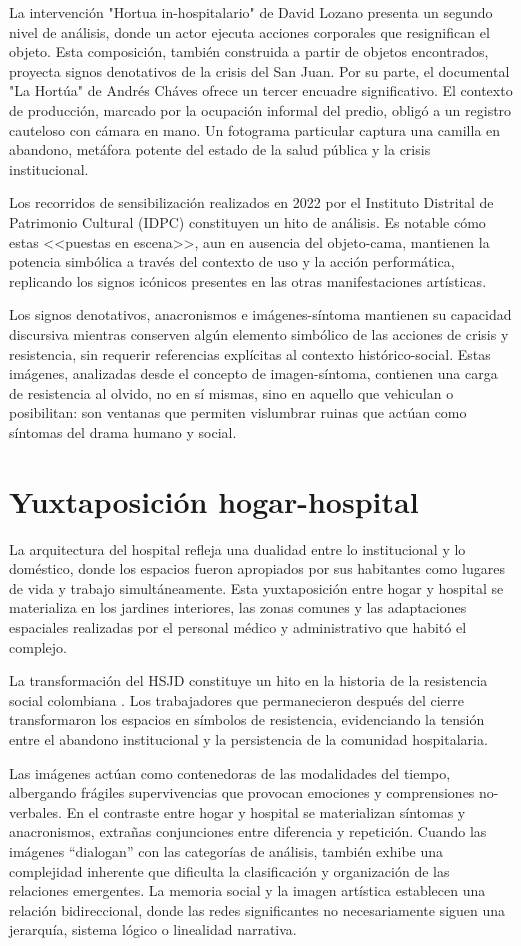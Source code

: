 La intervención "Hortua in-hospitalario" de David Lozano presenta un segundo nivel de análisis, donde un actor ejecuta acciones corporales que resignifican el objeto. Esta composición, también construida a partir de objetos encontrados, proyecta signos denotativos de la crisis del San Juan. Por su parte, el documental "La Hortúa" de Andrés Cháves ofrece un tercer encuadre significativo. El contexto de producción, marcado por la ocupación informal del predio, obligó a un registro cauteloso con cámara en mano. Un fotograma particular captura una camilla en abandono, metáfora potente del estado de la salud pública y la crisis institucional.

Los recorridos de sensibilización realizados en 2022 por el Instituto Distrital de Patrimonio Cultural (IDPC) constituyen un hito de análisis. Es notable cómo estas <<puestas en escena>>, aun en ausencia del objeto-cama, mantienen la potencia simbólica a través del contexto de uso y la acción performática, replicando los signos icónicos presentes en las otras manifestaciones artísticas.

Los signos denotativos, anacronismos e imágenes-síntoma mantienen su capacidad discursiva mientras conserven algún elemento simbólico de las acciones de crisis y resistencia, sin requerir referencias explícitas al contexto histórico-social. Estas imágenes, analizadas desde el concepto de imagen-síntoma, contienen una carga de resistencia al olvido, no en sí mismas, sino en aquello que vehiculan o posibilitan: son ventanas que permiten vislumbrar ruinas que actúan como síntomas del drama humano y social.

\section{Yuxtaposición hogar-hospital}

La arquitectura del hospital refleja una dualidad entre lo institucional y lo doméstico, donde los espacios fueron apropiados por sus habitantes como lugares de vida y trabajo simultáneamente. Esta yuxtaposición entre hogar y hospital se materializa en los jardines interiores, las zonas comunes y las adaptaciones espaciales realizadas por el personal médico y administrativo que habitó el complejo.

La transformación del HSJD constituye un hito en la historia de la resistencia social colombiana \parencite{Gongora2013}. Los trabajadores que permanecieron después del cierre transformaron los espacios en símbolos de resistencia, evidenciando la tensión entre el abandono institucional y la persistencia de la comunidad hospitalaria.

Las imágenes actúan como contenedoras de las modalidades del tiempo, albergando frágiles supervivencias que provocan emociones y comprensiones no-verbales. En el contraste entre hogar y hospital se materializan síntomas y anacronismos, extrañas conjunciones entre diferencia y repetición. Cuando las imágenes ``dialogan'' con las categorías de análisis, también exhibe una complejidad inherente que dificulta la clasificación y organización de las relaciones emergentes. La memoria social y la imagen artística establecen una relación bidireccional, donde las redes significantes no necesariamente siguen una jerarquía, sistema lógico o linealidad narrativa.